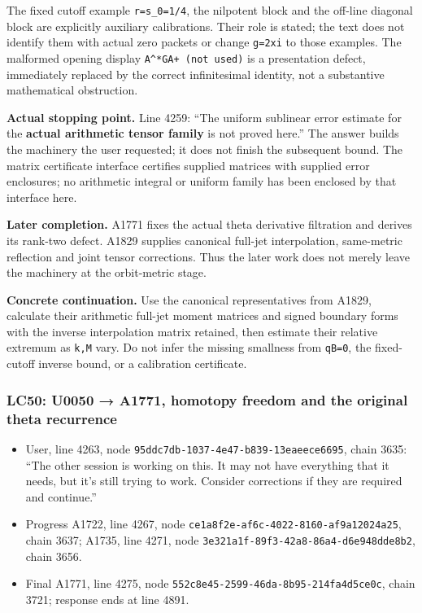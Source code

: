 The fixed cutoff example \texttt{r=s\_0=1/4}, the nilpotent block and
the off-line diagonal block are explicitly auxiliary calibrations. Their
role is stated; the text does not identify them with actual zero packets
or change \texttt{g=2xi} to those examples. The malformed opening
display \texttt{A\^{}*GA+\ (not\ used)} is a presentation defect,
immediately replaced by the correct infinitesimal identity, not a
substantive mathematical obstruction.

\textbf{Actual stopping point.} Line 4259: ``The uniform sublinear error
estimate for the \textbf{actual arithmetic tensor family} is not proved
here.'' The answer builds the machinery the user requested; it does not
finish the subsequent bound. The matrix certificate interface certifies
supplied matrices with supplied error enclosures; no arithmetic integral
or uniform family has been enclosed by that interface here.

\textbf{Later completion.} A1771 fixes the actual theta derivative
filtration and derives its rank-two defect. A1829 supplies canonical
full-jet interpolation, same-metric reflection and joint tensor
corrections. Thus the later work does not merely leave the machinery at
the orbit-metric stage.

\textbf{Concrete continuation.} Use the canonical representatives from
A1829, calculate their arithmetic full-jet moment matrices and signed
boundary forms with the inverse interpolation matrix retained, then
estimate their relative extremum as \texttt{k,M} vary. Do not infer the
missing smallness from \texttt{qB=0}, the fixed-cutoff inverse bound, or
a calibration certificate.

\subsubsection{LC50: U0050 → A1771, homotopy freedom and the original
theta
recurrence}\label{lc50-u0050-a1771-homotopy-freedom-and-the-original-theta-recurrence}

\begin{itemize}
\tightlist
\item
  User, line 4263, node \texttt{95ddc7db-1037-4e47-b839-13eaeece6695},
  chain 3635: ``The other session is working on this. It may not have
  everything that it needs, but it's still trying to work. Consider
  corrections if they are required and continue.''
\item
  Progress A1722, line 4267, node
  \texttt{ce1a8f2e-af6c-4022-8160-af9a12024a25}, chain 3637; A1735, line
  4271, node \texttt{3e321a1f-89f3-42a8-86a4-d6e948dde8b2}, chain 3656.
\item
  Final A1771, line 4275, node
  \texttt{552c8e45-2599-46da-8b95-214fa4d5ce0c}, chain 3721; response
  ends at line 4891.
\end{itemize}

